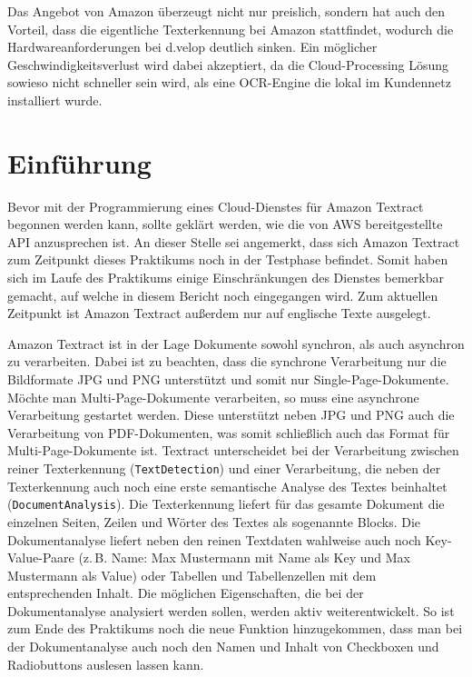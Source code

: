 \documentclass{whswinvcbook}
\begin{document}
Das Angebot von Amazon überzeugt nicht nur preislich, sondern hat auch den Vorteil, dass die eigentliche Texterkennung bei Amazon stattfindet, wodurch die Hardwareanforderungen bei d.velop deutlich sinken. Ein möglicher Geschwindigkeitsverlust wird dabei akzeptiert, da die Cloud-Processing Lösung sowieso nicht schneller sein wird, als eine OCR-Engine die lokal im Kundennetz installiert wurde.
\section{Einführung}
Bevor mit der Programmierung eines Cloud-Dienstes für Amazon Textract begonnen werden kann, sollte geklärt werden, wie die von AWS bereitgestellte API anzusprechen ist. An dieser Stelle sei angemerkt, dass sich Amazon Textract zum Zeitpunkt dieses Praktikums noch in der Testphase befindet. Somit haben sich im Laufe des Praktikums einige Einschränkungen des Dienstes bemerkbar gemacht, auf welche in diesem Bericht noch eingegangen wird. Zum aktuellen Zeitpunkt ist Amazon Textract außerdem nur auf englische Texte ausgelegt.

Amazon Textract ist in der Lage Dokumente sowohl synchron, als auch asynchron zu verarbeiten. Dabei ist zu beachten, dass die synchrone Verarbeitung nur die Bildformate JPG und PNG unterstützt und somit nur Single-Page-Dokumente. Möchte man Multi-Page-Dokumente verarbeiten, so muss eine asynchrone Verarbeitung gestartet werden. Diese unterstützt neben JPG und PNG auch die Verarbeitung von PDF-Dokumenten, was somit schließlich auch das Format für Multi-Page-Dokumente ist. Textract unterscheidet bei der Verarbeitung zwischen reiner Texterkennung (\texttt{TextDetection}) und einer Verarbeitung, die neben der Texterkennung auch noch eine erste semantische Analyse des Textes beinhaltet (\texttt{DocumentAnalysis}). Die Texterkennung liefert für das gesamte Dokument die einzelnen Seiten, Zeilen und Wörter des Textes als sogenannte Blocks. Die Dokumentanalyse liefert neben den reinen Textdaten wahlweise auch noch Key-Value-Paare (z.\,B. Name: Max Mustermann mit Name als Key und Max Mustermann als Value) oder Tabellen und Tabellenzellen mit dem entsprechenden Inhalt. Die möglichen Eigenschaften, die bei der Dokumentanalyse analysiert werden sollen, werden aktiv weiterentwickelt. So ist zum Ende des Praktikums noch die neue Funktion hinzugekommen, dass man bei der Dokumentanalyse auch noch den Namen und Inhalt von Checkboxen und Radiobuttons auslesen lassen kann.
\end{document}
